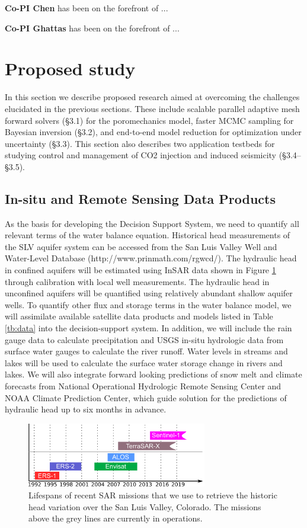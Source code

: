 \documentclass[11pt,final]{article}%
\begin{document}
\textbf{Co-PI Chen} has been on the forefront of ...

\textbf{Co-PI Ghattas} has been on the forefront of ...


\section{Proposed study}
In this section we describe proposed research aimed at overcoming the challenges elucidated in the previous sections. These include scalable parallel adaptive mesh forward solvers (§3.1) for the poromechanics model, faster MCMC sampling for Bayesian inversion (§3.2), and end-to-end model reduction for optimization under uncertainty (§3.3). This section also describes two application testbeds for studying control and management of CO2 injection and induced seismicity (§3.4–§3.5).

\subsection{In-situ and Remote Sensing Data Products}
As the basis for developing the Decision Support System, we need to quantify all relevant terms of the water balance equation. Historical head measurements of the SLV aquifer system can be accessed from the San Luis Valley Well and Water-Level Database (http://www.prinmath.com/rgwcd/). The hydraulic head in confined aquifers will be estimated using InSAR data shown in Figure \ref{fig:insar-mission} through calibration with local well measurements. The hydraulic head in unconfined aquifers will be quantified using relatively abundant shallow aquifer wells. To quantify other flux and storage terms in the water balance model, we will assimilate available satellite data products and models listed in Table \ref{tb:data} into the decision-support system. In addition, we will include the rain gauge data to calculate precipitation and USGS in-situ hydrologic data from surface water gauges to calculate the river runoff. Water levels in streams and lakes will be used to calculate the surface water storage change in rivers and lakes. We will also integrate forward looking predictions of snow melt and climate forecasts from National Operational Hydrologic Remote Sensing Center and NOAA Climate Prediction Center, which guide solution for the predictions of hydraulic head up to six months in advance.

\begin{figure}
\noindent\includegraphics[width=0.7\textwidth]{Figures/InSARmissions.pdf}
\caption{Lifespans of recent SAR missions that we use to retrieve the historic head variation over the San Luis Valley, Colorado. The missions above the grey lines are currently in operations.}
\label{fig:insar-mission}
\end{figure}
\end{document}
